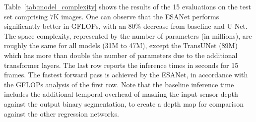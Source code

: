 Table~\ref{tab:model_complexity} shows the results of the 15 evaluations on the test set comprising 7K images. One can observe that the ESANet performs significantly better in GFLOPs, with an 80\% decrease from baseline and U-Net. The space complexity, represented by the number of parameters (in millions), are roughly the same for all models (31M to 47M), except the TransUNet (89M) which has more than double the number of parameters due to the additional transformer layers. The last row reports the inference times in seconds for 15 frames. The fastest forward pass is achieved by the ESANet, in accordance with the GFLOPs analysis of the first row. Note that the baseline inference time includes the additional temporal overhead of masking the input sensor depth against the output binary segmentation, to create a depth map for comparison against the other regression networks.

